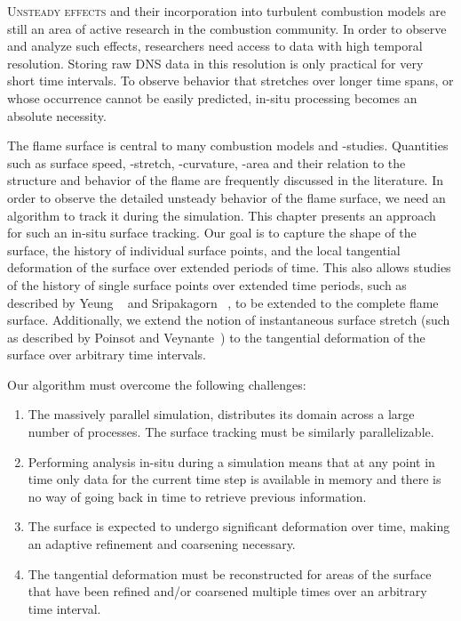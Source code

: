 \vspace{-\baselineskip}\lettrine[findent=0.3pt, loversize=-0.015,
lhang=0.04]{U}{nsteady effects} and their incorporation into turbulent
combustion models are still an area of active research in the combustion
community.
%
In order to observe and analyze such effects, researchers need access to data
with high temporal resolution.
%
Storing raw \ac{DNS} data in this resolution is only practical for very short
time intervals.
%
To observe behavior that stretches over longer time spans, or whose occurrence
cannot be easily predicted, in-situ processing becomes an absolute necessity.
%

%
The flame surface is central to many combustion models and -studies.
%
Quantities such as surface speed, -stretch, -curvature, -area and their
relation to the structure and behavior of the flame are frequently discussed in
the literature.
%
In order to observe the detailed unsteady behavior of the flame surface, we need
an algorithm to track it during the simulation.
%
This chapter presents an approach for such an in-situ surface tracking.
%
Our goal is to capture the shape of the surface, the history of individual
surface points, and the local tangential deformation of the surface over
extended periods of time.
%
This also allows studies of the history of single surface points over extended
time periods, such as described by Yeung \etal{}~\cite{Yeung1990} and Sripakagorn
\etal{}~\cite{Sripakagorn2004}, to be extended to the complete flame surface.
%
Additionally, we extend the notion of instantaneous surface stretch (such as
described by Poinsot and Veynante~\cite{Poinsot2012}) to the tangential
deformation of the surface over arbitrary time intervals.
%

%
Our algorithm must overcome the following challenges:
%
\begin{enumerate}
    \item \label{it:parallel}
        The massively parallel simulation, distributes its domain across a large
        number of processes. The surface tracking must be similarly
        parallelizable.
    \item \label{it:in-situ}
        Performing analysis in-situ during a simulation means that at any
        point in time only data for the current time step is available in
        memory and there is no way of going back in time to retrieve previous
        information.
    \item \label{it:refinement}
        The surface is expected to undergo significant deformation over time,
        making an adaptive refinement and coarsening necessary.
    \item \label{it:deformation}
        The tangential deformation must be reconstructed for areas of the
        surface that have been refined and/or coarsened multiple times over an
        arbitrary time interval.
\end{enumerate}
%

